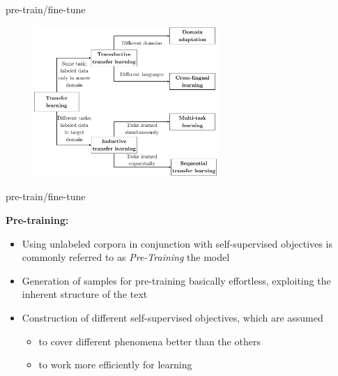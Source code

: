 
\begin{frame}{pre-train/fine-tune}

\vfill

\begin{figure}
	\centering
		\includegraphics[width = 7cm]{figure/transfer_learning_taxonomy-1.png}\\ 
\end{figure}

\vfill

\end{frame}


\begin{vbframe}{pre-train/fine-tune}

\vfill

\textbf{Pre-training:}

	\begin{itemize}
		\item Using unlabeled corpora in conjunction with self-supervised objectives 
					is commonly referred to as \textit{Pre-Training} the model
		\item Generation of samples for pre-training basically effortless, exploiting 
					the inherent structure of the text
		\item Construction of different self-supervised objectives, which are assumed
			\begin{itemize}
				\item to cover different phenomena better than the others
				\item to work more efficiently for learning
			\end{itemize}
	\end{itemize}
	
\vfill

\end{vbframe}

